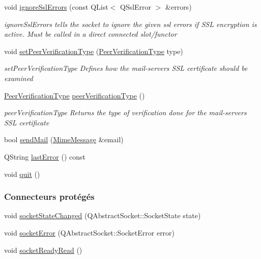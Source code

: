 \begin{DoxyCompactItemize}
void \hyperlink{class_simple_mail_1_1_sender_a05f1d8b1df8d4b3493858d4bd3991cf8}{ignore\+Ssl\+Errors} (const Q\+List$<$ Q\+Ssl\+Error $>$ \&errors)
\begin{DoxyCompactList}\small\item\em ignore\+Ssl\+Errors tells the socket to ignore the given ssl errors if S\+SL encryption is active. Must be called in a direct connected slot/functor \end{DoxyCompactList}\item 
void \hyperlink{class_simple_mail_1_1_sender_a5ca6eefacae85517e6ff45bfcd9fd0ba}{set\+Peer\+Verification\+Type} (\hyperlink{class_simple_mail_1_1_sender_acfbcf388ab7c26cd41c5c77601fe8804}{Peer\+Verification\+Type} type)
\begin{DoxyCompactList}\small\item\em set\+Peer\+Verification\+Type Defines how the mail-\/server\textquotesingle{}s S\+SL certificate should be examined \end{DoxyCompactList}\item 
\hyperlink{class_simple_mail_1_1_sender_acfbcf388ab7c26cd41c5c77601fe8804}{Peer\+Verification\+Type} \hyperlink{class_simple_mail_1_1_sender_ab0ae5815669d32f46dfd1758c3a34590}{peer\+Verification\+Type} ()
\begin{DoxyCompactList}\small\item\em peer\+Verification\+Type Returns the type of verification done for the mail-\/server\textquotesingle{}s S\+SL certificate \end{DoxyCompactList}\item 
bool \hyperlink{class_simple_mail_1_1_sender_a808b076c07f6e97e28fca75d0a069260}{send\+Mail} (\hyperlink{class_simple_mail_1_1_mime_message}{Mime\+Message} \&email)
\item 
Q\+String \hyperlink{class_simple_mail_1_1_sender_a490af129ea3af3a17f36ffd508a56bc1}{last\+Error} () const
\item 
void \hyperlink{class_simple_mail_1_1_sender_a9e60ec56a562bc41a58688a4566f6ff1}{quit} ()
\end{DoxyCompactItemize}
\subsubsection*{Connecteurs protégés}
\begin{DoxyCompactItemize}
\item 
void \hyperlink{class_simple_mail_1_1_sender_a40254c3f25402c5f9f813924a4770cd6}{socket\+State\+Changed} (Q\+Abstract\+Socket\+::\+Socket\+State state)
\item 
void \hyperlink{class_simple_mail_1_1_sender_a90dce16e10ea98518297b03eacb06812}{socket\+Error} (Q\+Abstract\+Socket\+::\+Socket\+Error error)
\item 
void \hyperlink{class_simple_mail_1_1_sender_a10913c23ccdb416865aa82a9139c6a08}{socket\+Ready\+Read} ()
\end{DoxyCompactItemize}
